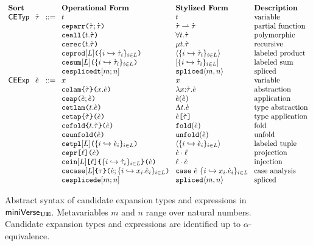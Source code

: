 \begin{enumerate}
\begin{figure}[p]
\hspace{-5px}$\arraycolsep=4pt\begin{array}{lllllll}
\textbf{Sort} & & & \textbf{Operational Form} & \textbf{Stylized Form} & \textbf{Description}\\
\mathsf{CETyp} & \ctau & ::= & t & t & \text{variable}\\
&&& \aceparr{\ctau}{\ctau} & \parr{\ctau}{\ctau} & \text{partial function}\\
&&& \aceall{t}{\ctau} & \forallt{t}{\ctau} & \text{polymorphic}\\
&&& \acerec{t}{\ctau} & \rect{t}{\ctau} & \text{recursive}\\
&&& \aceprod{\labelset}{\mapschema{\ctau}{i}{\labelset}} & \prodt{\mapschema{\ctau}{i}{\labelset}} & \text{labeled product}\\
&&& \acesum{\labelset}{\mapschema{\ctau}{i}{\labelset}} & \sumt{\mapschema{\ctau}{i}{\labelset}} & \text{labeled sum}\\
&&& \acesplicedt{m}{n} & \splicedt{m}{n} & \text{spliced}\\
\mathsf{CEExp} & \ce & ::= & x & x & \text{variable}\\
&&& \acelam{\ctau}{x}{\ce} & \lam{x}{\ctau}{\ce} & \text{abstraction}\\
&&& \aceap{\ce}{\ce} & \ap{\ce}{\ce} & \text{application}\\
&&& \acetlam{t}{\ce} & \Lam{t}{\ce} & \text{type abstraction}\\
&&& \acetap{\ce}{\ctau} & \App{\ce}{\ctau} & \text{type application}\\
&&& \acefold{t}{\ctau}{\ce} & \fold{\ce} & \text{fold}\\
&&& \aceunfold{\ce} & \unfold{\ce} & \text{unfold}\\
&&& \acetpl{\labelset}{\mapschema{\ce}{i}{\labelset}} & \tpl{\mapschema{\ce}{i}{\labelset}} & \text{labeled tuple}\\
&&& \acepr{\ell}{\ce} & \prj{\ce}{\ell} & \text{projection}\\
&&& \acein{\labelset}{\ell}{\mapschema{\ctau}{i}{\labelset}}{\ce} & \inj{\ell}{\ce} & \text{injection}\\
&&& \acecase{\labelset}{\tau}{\ce}{\mapschemab{x}{\ce}{i}{\labelset}} & \caseof{\ce}{\mapschemab{x}{\ce}{i}{\labelset}} & \text{case analysis}\\
&&& \acesplicede{m}{n} & \splicede{m}{n} & \text{spliced}
\end{array}$
\caption[Syntax of candidate expansion types and expressions in $\miniVerseUE$]{Abstract syntax of candidate expansion types and expressions in $\miniVerseUE$. Metavariables $m$ and $n$ range over natural numbers. Candidate expansion types and expressions are identified up to $\alpha$-equivalence.}
\label{fig:U-candidate-terms}
\end{figure}




\end{enumerate}
